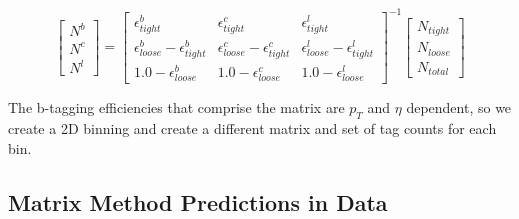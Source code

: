         \begin{equation}
            \begin{bmatrix} \scriptstyle
                N^b \\ \scriptstyle
                N^c \\ \scriptstyle
                N^l
            \end{bmatrix} 
            = 
            \begin{bmatrix} \scriptstyle
                \epsilon^b_{tight} & \scriptstyle \epsilon^c_{tight} & \scriptstyle \epsilon^l_{tight} \\  \scriptstyle
                \epsilon^b_{loose} - \epsilon^b_{tight} & \scriptstyle \epsilon^c_{loose} - \epsilon^c_{tight} & \scriptstyle \epsilon^l_{loose} - \epsilon^l_{tight} \\      \scriptstyle
                1.0 - \epsilon^b_{loose} & \scriptstyle 1.0 - \epsilon^c_{loose} & \scriptstyle  1.0 - \epsilon^l_{loose}
            \end{bmatrix}
            ^{-1}
            \begin{bmatrix} \scriptstyle
            N_{tight} \\ \scriptstyle
            N_{loose} \\ \scriptstyle
            N_{total}
            \end{bmatrix}  
        \label{eq:matrix2} 
        \end{equation} %

The b-tagging efficiencies that comprise the matrix are $p_T$ and $\eta$ dependent, so we create a 2D binning and create a different matrix and set of tag counts for each bin.  

\subsection{Matrix Method Predictions in Data}



